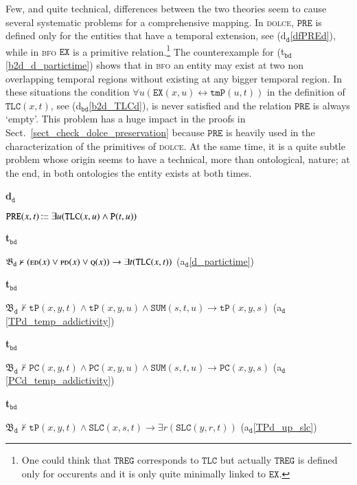 \documentclass[ao]{iosart2x}
\newcommand{\bflist}{\begin{list}{}{\setlength{\topsep}{2mm}\setlength{\parsep}{0mm}\setlength{\leftmargin}{9.2mm}\setlength{\labelwidth}{8mm}}}
\newcommand{\eflist}{\end{list}}
\newcommand{\dolceAxLabel}{\textrm{a$_\texttt{d}$}}
\newcommand{\dolceDefLabel}{\textrm{d$_\texttt{d}$}}
\newcommand{\bdDefLabel}{\textrm{d$_\texttt{bd}$}}
\newcommand{\bdThrLabel}{\textrm{t$_\texttt{bd}$}}
\newcounter{cntdef}
\newcommand{\dolcedf}[1]{\refstepcounter{cntdef}\begin{small}{\bf \dolceDefLabel\thecntdef\label{#1}}\end{small}}
\newcounter{cntbdth}
\newcommand{\bdth}[1]{\refstepcounter{cntbdth}\begin{small}{\bf \bdThrLabel\thecntbdth\label{#1}}\end{small}}
\newcommand{\refdolceax}[1]{({\dolceAxLabel}\ref{#1})}
\newcommand{\refdolcedf}[1]{({\dolceDefLabel}\ref{#1})}
\newcommand{\refbddf}[1]{({\bdDefLabel}\ref{#1})}
\newcommand{\refbdth}[1]{({\bdThrLabel}\ref{#1})}
\newcommand{\pr}[1]{\mathtt{#1}}
\newcommand{\ifif}{\leftrightarrow}
\newcommand\textequal{%
 \rule[.08ex]{5pt}{0.35pt}\llap{\rule[.78ex]{5pt}{0.35pt}}}
\newcommand{\sdef}{{\hspace{1.5pt}:\hspace{-2.5pt}\textequal\hspace{3pt}}}
\newcommand{\dolce}{{\textsc{dolce}}}
\newcommand{\bfo}{{\textsc{bfo}}}
\newcommand {\thbfobdmap} {\ensuremath{\mathfrak{B}_\texttt{d}}}
\newcommand {\EDdcat} {\textsc{ed}}
\newcommand {\PDdcat} {\textsc{pd}}
\newcommand {\Qdcat} {\textsc{q}}
\newcommand {\TPd} {\ensuremath{\pr{tP}}}
\newcommand {\SUMd} {\ensuremath{\pr{SUM}}}
\newcommand {\Pd} {\ensuremath{\pr{P}}}
\newcommand {\PREd} {\ensuremath{\pr{PRE}}}
\newcommand {\PCd} {\ensuremath{\pr{PC}}}
\newcommand {\SLCd} {\ensuremath{\pr{SLC}}}
\newcommand {\TLCd} {\ensuremath{\pr{TLC}}}
\newcommand{\bfotpart}{\pr{tmP}}
\newcommand{\bfoexist}{\pr{EX}}
\newcommand{\bfotregof}{\pr{TREG}}
\begin{document}
Few, and quite technical, differences between the two theories seem to cause several systematic problems for a comprehensive mapping. In {\dolce}, $\PREd$ is defined only for the entities that have a temporal extension, see \refdolcedf{dfPREd}, while in {\bfo} $\bfoexist$ is a primitive relation.\footnote{One could think that $\bfotregof$ corresponds to $\TLCd$ but actually $\bfotregof$ is defined only for occurents and it is only quite minimally linked to $\bfoexist$.}  The counterexample for \refbdth{b2d_d_partictime} shows that in {\bfo} an entity may exist at two non overlapping temporal regions without existing at any bigger temporal region. In these situations the condition $\forall u(\bfoexist(x,u) \ifif \bfotpart(u,t))$ in the definition of $\TLCd(x,t)$, see \refbddf{b2d_TLCd}, is never satisfied and the relation $\PREd$ is always `empty'. This problem has a huge impact in the proofs in Sect.~\ref{sect_check_dolce_preservation} because $\PREd$ is heavily used in the characterization of the primitives of {\dolce}. At the same time, it is a quite subtle problem whose origin seems to have a technical, more than ontological, nature; at the end,  in both ontologies the entity exists at both times. 
%
\bflist
\item[\dolcedf{dfPREd}] $\PREd(x,t) \sdef \exists u(\TLCd(x,u) \land \Pd(t,u))$ 

\item[\bdth{b2d_d_partictime}] $\thbfobdmap \nvdash (\EDdcat(x) \lor \PDdcat(x) \lor \Qdcat(x)) \to \exists t(\TLCd(x,t))$ 
\hfill{\refdolceax{d_partictime}} 

\item[\bdth{b2d_TPd_temp_addictivity}] $\thbfobdmap \nvdash \TPd(x,y,t) \land \TPd(x,y,u) \land \SUMd(s,t,u) \to \TPd(x,y,s)$ 
\hfill{\refdolceax{TPd_temp_addictivity}} 

\item[\bdth{b2d_PCd_temp_addictivity}] $\thbfobdmap \nvdash \PCd(x,y,t) \land \PCd(x,y,u) \land \SUMd(s,t,u) \to \PCd(x,y,s)$ 
\hfill{\refdolceax{PCd_temp_addictivity}} 

\item[\bdth{b2d_TPd_up_slc}] $\thbfobdmap \nvdash \TPd(x,y,t) \land \SLCd(x,s,t) \to \exists r (\SLCd(y,r,t))$ 
\hfill{\refdolceax{TPd_up_slc}} 
\eflist
\end{document}
